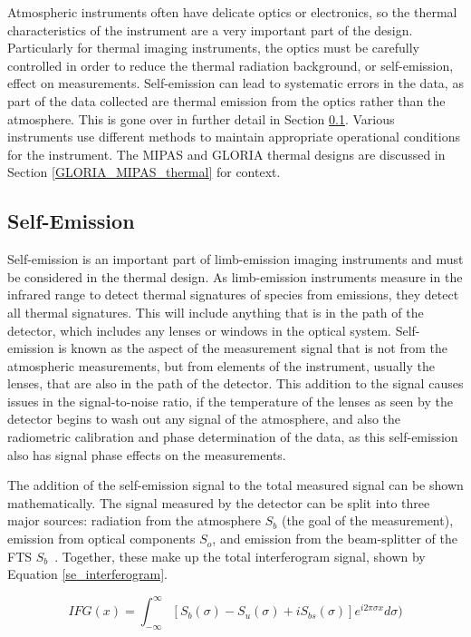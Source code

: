 Atmospheric instruments often have delicate optics or electronics, so the thermal characteristics of the instrument are a very important part of the design. Particularly for thermal imaging instruments, the optics must be carefully controlled in order to reduce the thermal radiation background, or self-emission, effect on measurements. Self-emission can lead to systematic errors in the data, as part of the data collected are thermal emission from the optics rather than the atmosphere. This is gone over in further detail in Section \ref{self-emission}. Various instruments use different methods to maintain appropriate operational conditions for the instrument. The MIPAS and GLORIA thermal designs are discussed in Section \ref{GLORIA_MIPAS_thermal} for context. 

\subsection{Self-Emission}\label{self-emission}

Self-emission is an important part of limb-emission imaging instruments and must be considered in the thermal design. As limb-emission instruments measure in the infrared range to detect thermal signatures of species from emissions, they detect all thermal signatures. This will include anything that is in the path of the detector, which includes any lenses or windows in the optical system. Self-emission is known as the aspect of the measurement signal that is not from the atmospheric measurements, but from elements of the instrument, usually the lenses, that are also in the path of the detector. This addition to the signal causes issues in the signal-to-noise ratio, if the temperature of the lenses as seen by the detector begins to wash out any signal of the atmosphere, and also the radiometric calibration and phase determination of the data, as this self-emission also has signal phase effects on the measurements.

The addition of the self-emission signal to the total measured signal can be shown mathematically. The signal measured by the detector can be split into three major sources: radiation from the atmosphere $S_b$ (the goal of the measurement), emission from optical components $S_o$, and emission from the beam-splitter of the FTS $S_b$~\citep{self-emission_general}. Together, these make up the total interferogram signal, shown by Equation \ref{se_interferogram}. 

\begin{equation}\label{se_interferogram}
    IFG(x) = \int_{-\infty}^{\infty} [S_b(\sigma) - S_u(\sigma) + iS_{bs}(\sigma)]e^{i2\pi\sigma x} d\sigma)
\end{equation}

